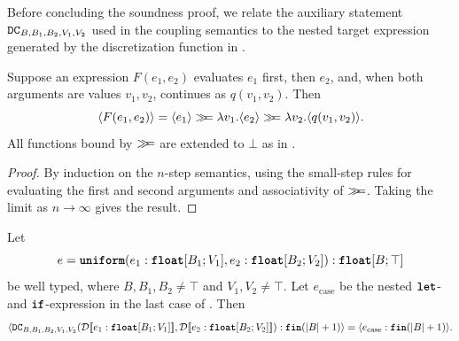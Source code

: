 Before concluding the soundness proof, we relate the auxiliary
statement $\texttt{DC}_{B,B_1,B_2,V_1,V_2}$ used in the coupling semantics to the nested target
expression generated by the discretization function in
.


\begin{lemma}
\label{lem:sequential-evaluation}
Suppose an expression $F(e_1,e_2)$ evaluates $e_1$ first, then
$e_2$, and, when both arguments are values $v_1,v_2$, continues
as $q(v_1,v_2)$. Then
\[
	\langle F(e_1,e_2) \rangle
	=
	\langle e_1 \rangle
	\gg\!\!=
	\lambda v_1.
	\langle e_2 \rangle
	\gg\!\!=
	\lambda v_2.
	\langle q(v_1,v_2) \rangle.
\]
All functions bound by $\gg\!\!=$ are extended to $\bot$ as in
.
\end{lemma}

\begin{proof}
By induction on the $n$-step semantics, using the small-step rules
for evaluating the first and second arguments and associativity of
$\gg\!\!=$. Taking the limit as $n\to\infty$ gives the result.
\end{proof}


\begin{theorem}
\label{thm:dc-expansion}
Let
\[
e
=
\textnormal{\ttfamily\bfseries uniform}(
  e_1 : \textnormal{\ttfamily\bfseries float}[B_1;V_1],
  e_2 : \textnormal{\ttfamily\bfseries float}[B_2;V_2]
)
:
\textnormal{\ttfamily\bfseries float}[B;\top]
\]
be well typed, where $B,B_1,B_2\neq\top$ and
$V_1,V_2\neq\top$. Let $e_{\mathrm{case}}$ be the nested
$\textnormal{\ttfamily\bfseries let}$- and $\textnormal{\ttfamily\bfseries if}$-expression in the last case of
. Then
\[
\langle 
  \texttt{DC}_{B,B_1,B_2,V_1,V_2}(
    \mathcal{D}\llbracket e_1 : \textnormal{\ttfamily\bfseries float}[B_1;V_1] \rrbracket,
    \mathcal{D}\llbracket e_2 : \textnormal{\ttfamily\bfseries float}[B_2;V_2] \rrbracket
  )
  :
  \textnormal{\ttfamily\bfseries fin}(|B|+1)
 \rangle
=
\langle 
  e_{\mathrm{case}}
  :
  \textnormal{\ttfamily\bfseries fin}(|B|+1)
 \rangle.
\]
\end{theorem}

